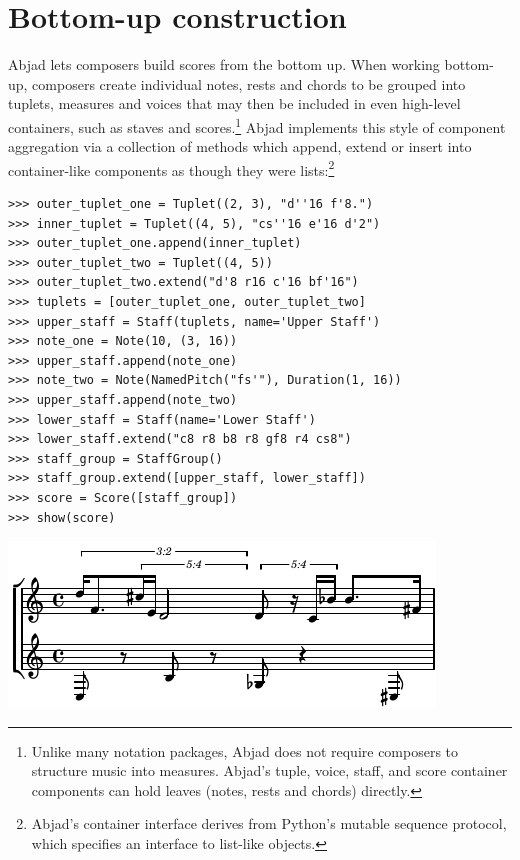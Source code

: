 \documentclass{article}
\begin{document}
\section{Bottom-up construction} \label{sec:bottom-up}

Abjad lets composers build scores from the bottom up. When working bottom-up,
composers create individual notes, rests and chords to be grouped
into tuplets, measures and voices that may then be
included in even high-level containers, such as staves and scores.\footnote{Unlike many notation packages, Abjad does not require composers to structure music into measures. Abjad's tuple, voice, staff, and score container components can hold leaves (notes, rests and chords) directly.} Abjad implements this style of
component aggregation via a collection of methods which append, extend or
insert into container-like components as though they were
lists:\footnote{Abjad's container interface derives from Python's mutable
sequence protocol, which specifies an interface to list-like objects.}

\begin{lstlisting}
>>> outer_tuplet_one = Tuplet((2, 3), "d''16 f'8.")
>>> inner_tuplet = Tuplet((4, 5), "cs''16 e'16 d'2")
>>> outer_tuplet_one.append(inner_tuplet)
>>> outer_tuplet_two = Tuplet((4, 5))
>>> outer_tuplet_two.extend("d'8 r16 c'16 bf'16")
>>> tuplets = [outer_tuplet_one, outer_tuplet_two]
>>> upper_staff = Staff(tuplets, name='Upper Staff')
>>> note_one = Note(10, (3, 16))
>>> upper_staff.append(note_one)
>>> note_two = Note(NamedPitch("fs'"), Duration(1, 16))
>>> upper_staff.append(note_two)
>>> lower_staff = Staff(name='Lower Staff')
>>> lower_staff.extend("c8 r8 b8 r8 gf8 r4 cs8")
>>> staff_group = StaffGroup()
>>> staff_group.extend([upper_staff, lower_staff])
>>> score = Score([staff_group])
>>> show(score)
\end{lstlisting}
\includegraphics{assets/lilypond-45865c9ff19c72c1c9f7a6f4234e8546.pdf}
\end{document}
